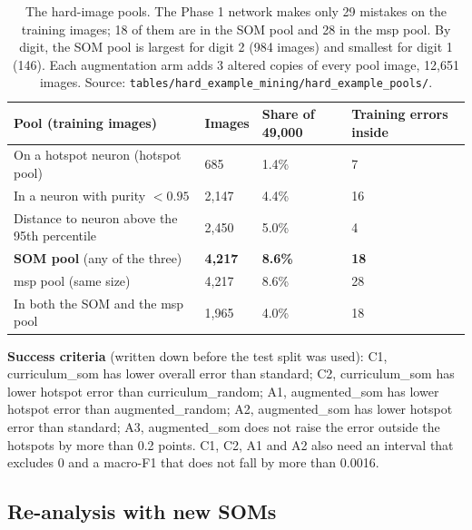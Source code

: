 \documentclass[11pt]{article}
\begin{document}
\begin{table}[H]
\centering
\renewcommand{\arraystretch}{1.1}
\small
\begin{tabular}{|l|C{0.11\textwidth}|C{0.13\textwidth}|C{0.17\textwidth}|}
\hline
\textbf{Pool (training images)} & \textbf{Images} & \textbf{Share of 49,000} & \textbf{Training errors inside} \\ \hline
On a hotspot neuron (hotspot pool) & 685 & 1.4\% & 7 \\ \hline
In a neuron with purity $<0.95$ & 2,147 & 4.4\% & 16 \\ \hline
Distance to neuron above the 95th percentile & 2,450 & 5.0\% & 4 \\ \hline
\textbf{SOM pool} (any of the three) & \textbf{4,217} & \textbf{8.6\%} & \textbf{18} \\ \hline
msp pool (same size) & 4,217 & 8.6\% & 28 \\ \hline
In both the SOM and the msp pool & 1,965 & 4.0\% & 18 \\ \hline
\end{tabular}
\caption{The hard-image pools. The Phase 1 network makes only 29 mistakes on the training images; 18 of them are in the SOM pool and 28 in the msp pool. By digit, the SOM pool is largest for digit 2 (984 images) and smallest for digit 1 (146). Each augmentation arm adds 3 altered copies of every pool image, 12,651 images. Source: \texttt{tables/hard\_example\_mining/hard\_example\_pools/}.}
\label{tab:pools}
\end{table}

\textbf{Success criteria} (written down before the test split was used): C1, curriculum\_som has lower overall error than standard; C2, curriculum\_som has lower hotspot error than curriculum\_random; A1, augmented\_som has lower hotspot error than augmented\_random; A2, augmented\_som has lower hotspot error than standard; A3, augmented\_som does not raise the error outside the hotspots by more than 0.2 points. C1, C2, A1 and A2 also need an interval that excludes 0 and a macro-F1 that does not fall by more than 0.0016.

\subsection*{Re-analysis with new SOMs}
\end{document}
